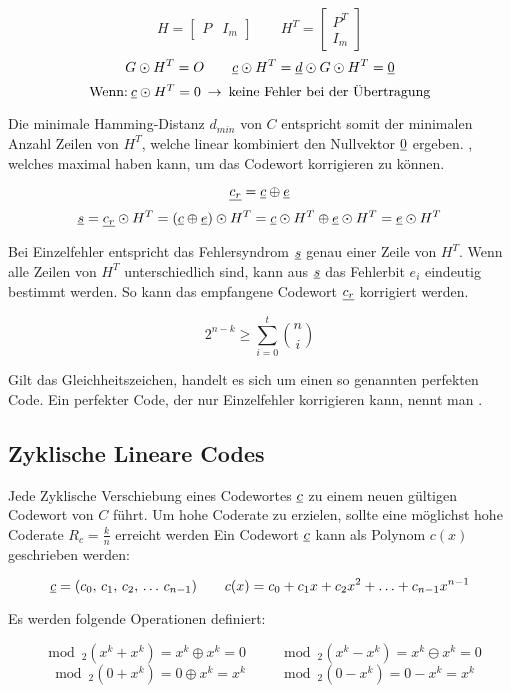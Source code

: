 \documentclass[a4paper]{article}
\begin{document}
\begin{twocolumn}
$$H = \left[ \begin{array}{ll} P & I_m \end{array} \right] \qquad H^T = 
\left[ \begin{array}{l} P^T \\ I_m \end{array} \right]$$
$$G \odot H^T = O \qquad \underline{c} \odot H^T = \underline{d} \odot G \odot H^T = \underline{0}$$
$$\text{Wenn:} \: \underline{c} \odot H^T = 0 \: \rightarrow \: \text{keine Fehler bei der Übertragung}$$

Die minimale Hamming-Distanz $d_{min}$ von $C$ entspricht somit der minimalen Anzahl Zeilen 
von $H^T$, welche linear kombiniert den Nullvektor $\underline{0}$ ergeben. 
, welches maximal  haben kann, um das Codewort korrigieren zu können.

$$\underline{c_r} = \underline{c} \oplus \underline{e}$$ 
$$\underline{s} = \underline{c_r} \odot H^T = (\underline{c} \oplus \underline{e}) \odot H^T = \underline{c} \odot H^T \oplus \underline{e} \odot H^T = \underline{e} \odot H^T$$

Bei Einzelfehler entspricht das Fehlersyndrom $\underline{s}$ genau einer Zeile von $H^T$. 
Wenn alle Zeilen von $H^T$ unterschiedlich sind, kann aus $\underline{s}$ das Fehlerbit $e_i$ eindeutig bestimmt werden.
So kann das empfangene Codewort $\underline{c_r}$ korrigiert werden. 

$$2^{n-k} \geq \sum_{i=0}^t \binom{n}{i}$$

Gilt das Gleichheitszeichen, handelt es sich um einen so genannten perfekten Code. 
Ein perfekter Code, der nur Einzelfehler korrigieren kann, nennt man .

\subsection{Zyklische Lineare Codes}
Jede Zyklische Verschiebung eines Codewortes $\underline{c}$ zu einem neuen gültigen Codewort von $C$ führt.
Um hohe Coderate zu erzielen, sollte eine möglichst hohe Coderate $R_c = \frac{k}{n}$ erreicht werden
Ein Codewort $\underline{c}$ kann als Polynom $c(x)$ geschrieben werden:

$$\underline{c} = (c_0, \, c_1, \, c_2, \, \ldots \, c_{n-1}) \qquad c(x) = c_0 + c_1 x + c_2 x^2 + \ldots + c_{n-1} x^{n-1}$$

Es werden folgende Operationen definiert:

$$\mod_2(x^k + x^k) = x^k \oplus x^k = 0 \qquad \mod_2 (x^k - x^k) = x^k \ominus x^k = 0$$
$$\mod_2(0+x^k) = 0 \oplus x^k = x^k \qquad \mod_2(0-x^k) = 0 - x^k = x^k$$


\end{twocolumn}
\end{document}
